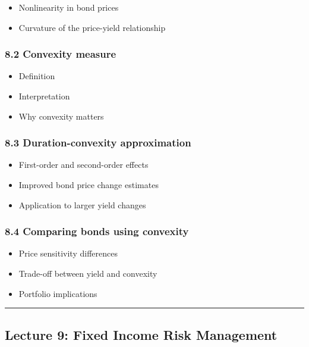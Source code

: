 \documentclass[
  letterpaper,
  DIV=11,
  numbers=noendperiod]{scrartcl}
\providecommand{\tightlist}{%
  \setlength{\itemsep}{0pt}\setlength{\parskip}{0pt}}
\begin{document}
\begin{itemize}
\tightlist
\item
  Nonlinearity in bond prices
\item
  Curvature of the price-yield relationship
\end{itemize}

\subsubsection{8.2 Convexity measure}\label{convexity-measure}

\begin{itemize}
\tightlist
\item
  Definition
\item
  Interpretation
\item
  Why convexity matters
\end{itemize}

\subsubsection{8.3 Duration-convexity
approximation}\label{duration-convexity-approximation}

\begin{itemize}
\tightlist
\item
  First-order and second-order effects
\item
  Improved bond price change estimates
\item
  Application to larger yield changes
\end{itemize}

\subsubsection{8.4 Comparing bonds using
convexity}\label{comparing-bonds-using-convexity}

\begin{itemize}
\tightlist
\item
  Price sensitivity differences
\item
  Trade-off between yield and convexity
\item
  Portfolio implications
\end{itemize}

\begin{center}\rule{0.5\linewidth}{0.5pt}\end{center}

\subsection{Lecture 9: Fixed Income Risk
Management}\label{lecture-9-fixed-income-risk-management}
\end{document}

